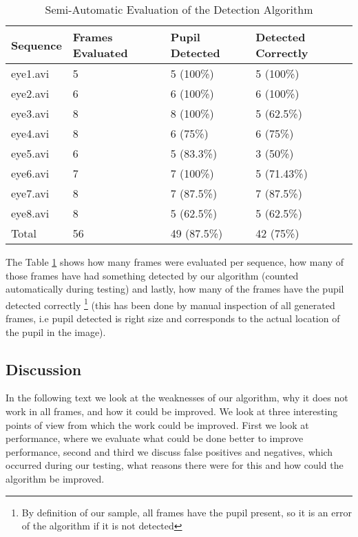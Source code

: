 \begin{table}[h!]
	\center
	\begin{tabular}{ |l|l|l|l| }
		\hline
		Sequence & Frames Evaluated & Pupil Detected & Detected Correctly \\ \hline
		
		eye1.avi 	& 5 	& 5 (100\%)	& 5 (100\%) \\
		eye2.avi 	& 6 	& 6 (100\%)	& 6 (100\%) \\
		eye3.avi 	& 8 	& 8 (100\%)	& 5 (62.5\%) \\
		eye4.avi 	& 8 	& 6 (75\%)	& 6 (75\%) \\
		eye5.avi 	& 6 	& 5 (83.3\%)	& 3 (50\%) \\
		eye6.avi 	& 7 	& 7 (100\%)	& 5 (71.43\%) \\
		eye7.avi 	& 8 	& 7 (87.5\%)	& 7 (87.5\%) \\
		eye8.avi 	& 8 	& 5 (62.5\%)	& 5 (62.5\%) \\
		
		\hline
		Total 	& 56 & 49 (87.5\%) & 42 (75\%) \\ 
		\hline
	\end{tabular}
	\caption{Semi-Automatic Evaluation of the Detection Algorithm}
	\label{tab:eval}
\end{table}

The Table \ref{tab:eval} shows how many frames were evaluated per sequence, how many of those frames have had something detected by our algorithm (counted automatically during testing) and lastly, how many of the frames have the pupil detected correctly \footnote{By definition of our sample, all frames have the pupil present, so it is an error of the algorithm if it is not detected} (this has been done by manual inspection of all generated frames, i.e pupil detected is right size and corresponds to the actual location of the pupil in the image). 

\subsection{Discussion}
In the following text we look at the weaknesses of our algorithm, why it does not work in all frames, and how it could be improved. We look at three interesting points of view from which the work could be improved. First we look at performance, where we evaluate what could be done better to improve performance, second and third we discuss false positives and negatives, which occurred during our testing, what reasons there were for this and how could the algorithm be improved.

